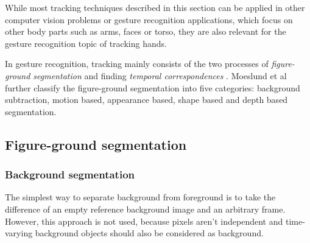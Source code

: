 While most tracking techniques described in this section can be applied in other computer vision problems or gesture recognition applications, which focus on other body parts such as arms, faces or torso, they are also relevant for the gesture recognition topic of tracking hands.

In gesture recognition, tracking mainly consists of the two processes of \textit{figure-ground segmentation} and finding \textit{temporal correspondences} \cite{Moeslund}. Moeslund et al further classify the figure-ground segmentation into five categories: background subtraction, motion based, appearance based, shape based and depth based segmentation.

\subsection{Figure-ground segmentation}
\label{sub:figure-ground-segmentation}

\subsubsection{Background segmentation}
The simplest way to separate background from foreground is to take the difference of an empty reference background image and an arbitrary frame. However, this approach is not used, because pixels aren't independent and time-varying background objects should also be considered as background.

